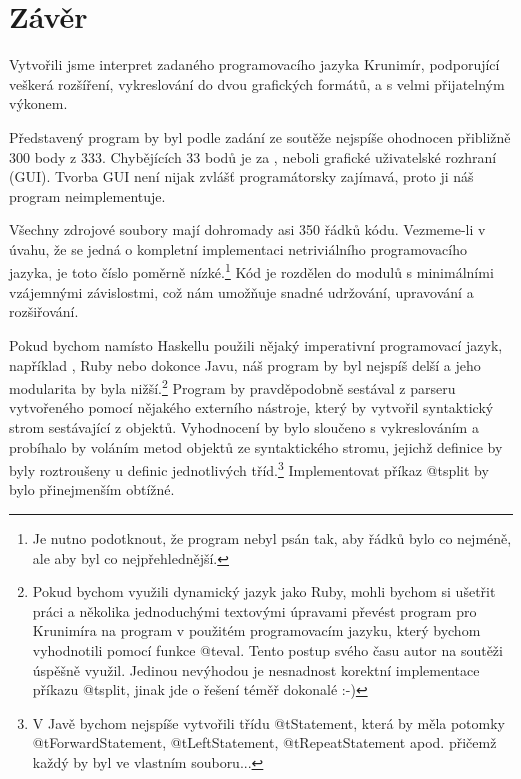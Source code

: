 \section{Závěr}

Vytvořili jsme interpret zadaného programovacího jazyka Krunimír, podporující
veškerá rozšíření, vykreslování do dvou grafických formátů, a s velmi
přijatelným výkonem.

Představený program by byl podle zadání ze soutěže nejspíše ohodnocen přibližně
300 body z 333.  Chybějících 33 bodů je za , neboli
grafické uživatelské rozhraní (GUI). Tvorba GUI není nijak zvlášť
programátorsky zajímavá, proto ji náš program neimplementuje.

Všechny zdrojové soubory mají dohromady asi 350 řádků kódu. Vezmeme-li v úvahu,
že se jedná o kompletní implementaci netriviálního programovacího jazyka, je
toto číslo poměrně nízké.\footnote{Je nutno podotknout, že program nebyl psán
  tak, aby řádků bylo co nejméně, ale aby byl co nejpřehlednější.} Kód je
rozdělen do modulů s minimálními vzájemnými závislostmi, což nám umožňuje snadné
udržování, upravování a rozšiřování. 

Pokud bychom namísto Haskellu použili nějaký imperativní programovací jazyk,
například \Cplusplus{}, Ruby nebo dokonce Javu, náš program by byl nejspíš delší
a jeho modularita by byla nižší.\footnote{
  Pokud bychom využili dynamický jazyk jako Ruby, mohli bychom si ušetřit práci
  a několika jednoduchými textovými úpravami převést program pro Krunimíra na
  program v použitém programovacím jazyku, který bychom vyhodnotili pomocí
  funkce @t{eval}. Tento postup svého času autor na soutěži úspěšně využil.
  Jedinou nevýhodou je nesnadnost korektní implementace příkazu @t{split}, jinak
  jde o řešení téměř dokonalé :-)
} Program
by pravděpodobně sestával z parseru vytvořeného pomocí nějakého externího
nástroje, který by vytvořil syntaktický strom sestávající z objektů. Vyhodnocení
by bylo sloučeno s vykreslováním a probíhalo by voláním metod objektů ze
syntaktického stromu, jejichž definice by byly roztroušeny u definic
jednotlivých tříd.\footnote{
  V Javě bychom nejspíše vytvořili třídu @t{Statement}, která by měla potomky
  @t{ForwardStatement}, @t{LeftStatement}, @t{RepeatStatement} apod. přičemž
  každý by byl ve vlastním souboru...
}
Implementovat příkaz @t{split} by bylo přinejmenším obtížné.
